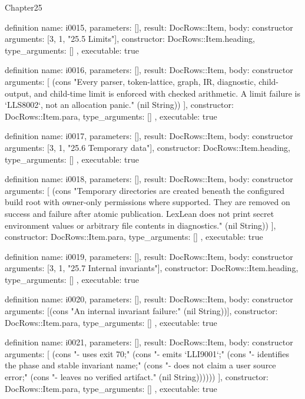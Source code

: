 \begin{lexlean}{Chapter25}
\begin{semanticmodule}
definition{
  name: i0015,
  parameters: [],
  result: DocRows::Item,
  body: constructor{
    arguments: [3, 1, "25.5 Limits"],
    constructor: DocRows::Item.heading,
    type_arguments: []
  },
  executable: true
}

definition{
  name: i0016,
  parameters: [],
  result: DocRows::Item,
  body: constructor{
    arguments: [
      (cons "Every parser, token-lattice, graph, IR, diagnostic, child-output, and child-time limit is enforced with checked arithmetic. A limit failure is `LLS8002`, not an allocation panic." (nil String))
    ],
    constructor: DocRows::Item.para,
    type_arguments: []
  },
  executable: true
}

definition{
  name: i0017,
  parameters: [],
  result: DocRows::Item,
  body: constructor{
    arguments: [3, 1, "25.6 Temporary data"],
    constructor: DocRows::Item.heading,
    type_arguments: []
  },
  executable: true
}

definition{
  name: i0018,
  parameters: [],
  result: DocRows::Item,
  body: constructor{
    arguments: [
      (cons "Temporary directories are created beneath the configured build root with owner-only permissions where supported. They are removed on success and failure after atomic publication. LexLean does not print secret environment values or arbitrary file contents in diagnostics." (nil String))
    ],
    constructor: DocRows::Item.para,
    type_arguments: []
  },
  executable: true
}

definition{
  name: i0019,
  parameters: [],
  result: DocRows::Item,
  body: constructor{
    arguments: [3, 1, "25.7 Internal invariants"],
    constructor: DocRows::Item.heading,
    type_arguments: []
  },
  executable: true
}

definition{
  name: i0020,
  parameters: [],
  result: DocRows::Item,
  body: constructor{
    arguments: [(cons "An internal invariant failure:" (nil String))],
    constructor: DocRows::Item.para,
    type_arguments: []
  },
  executable: true
}

definition{
  name: i0021,
  parameters: [],
  result: DocRows::Item,
  body: constructor{
    arguments: [
      (cons "- uses exit 70;" (cons "- emits `LLI9001`;" (cons "- identifies the phase and stable invariant name;" (cons "- does not claim a user source error;" (cons "- leaves no verified artifact." (nil String))))))
    ],
    constructor: DocRows::Item.para,
    type_arguments: []
  },
  executable: true
}
\end{semanticmodule}
\end{lexlean}
